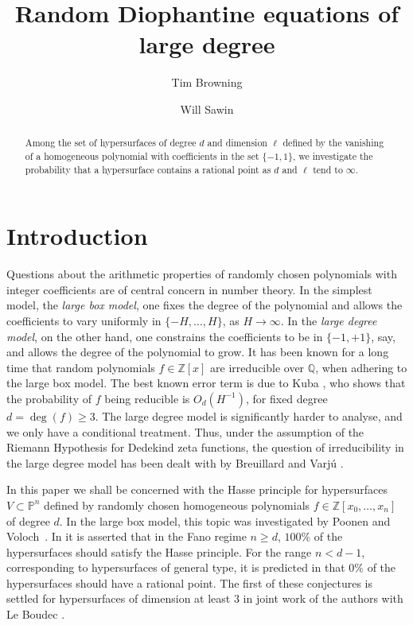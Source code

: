 \documentclass[11pt, reqno]{amsart}
\title{Random Diophantine equations of large degree}
\author{Tim Browning}
\author{Will Sawin}
\numberwithin{equation}{section}
\renewcommand{\geq}{\geqslant}
\begin{document}
\begin{abstract}
Among the set of hypersurfaces of degree $d$ and dimension $\ell$ defined by the vanishing of a homogeneous polynomial with coefficients in the set $\{-1, 1\}$, we investigate the  probability that a hypersurface contains a rational point as $d$ and $\ell$ tend to $\infty$.
\end{abstract}

\maketitle

\setcounter{tocdepth}{1}
\tableofcontents

\thispagestyle{empty}

\newtheorem{theorem}{Theorem}[section]
\newtheorem{lemma}[theorem]{Lemma}
\newtheorem{con}[theorem]{Conjecture}

\theoremstyle{definition}
\newtheorem*{ack}{Acknowledgements}
\newtheorem{definition}[theorem]{Definition}

\section{Introduction}



Questions about the arithmetic properties of randomly chosen polynomials with integer coefficients
are of central concern in number theory. 
In the simplest model, the {\em large box model}, one fixes the degree of the polynomial 
and allows the coefficients to vary uniformly in $\{-H,\dots,H\}$, as $H\to \infty$.
In the {\em large degree model}, on the other hand, one constrains the coefficients to be in 
 $\{-1,+1\}$, say,  and allows the degree of the polynomial to grow. 
It has been known for a long time that  random polynomials $f\in \mathbb{Z}[x]$ 
are irreducible over $\mathbb{Q}$, when adhering to the large box model.  The best known error term is due to Kuba \cite{kuba}, who  shows that the probability of $f$ being reducible is $O_d(H^{-1})$, for fixed degree $d=\deg(f)\geq 3$. The  large degree model is significantly harder to analyse, and we only have a conditional treatment. Thus, 
under the assumption of the Riemann Hypothesis  for Dedekind zeta functions, 
the question of irreducibility in  the large degree model has been dealt with  by Breuillard and Varj\'u \cite{irred}.

In this paper we shall be concerned with the Hasse principle for 
hypersurfaces $V\subset \mathbb{P}^{n}$ defined by 
randomly chosen homogeneous 
polynomials 
$f\in \mathbb{Z}[x_0,\dots,x_n]$ of degree $d$. 
In the large box model, 
this topic was 
investigated by Poonen and Voloch~\cite{PV}.  In 
\cite[Conjecture 2.2.(ii)]{PV} it is asserted that in the Fano regime  $n \geq d$, $100\%$ of the hypersurfaces should satisfy the Hasse principle.  For the range
 $n < d-1$, corresponding to  hypersurfaces of general type, 
it is predicted in \cite[Conjecture 2.2.(i)]{PV} that $0\%$ of the hypersurfaces should have a rational point.
The first  of these conjectures is settled for  hypersurfaces of dimension at least $3$
in joint work of the authors with Le Boudec  \cite{random}.
\end{document}
